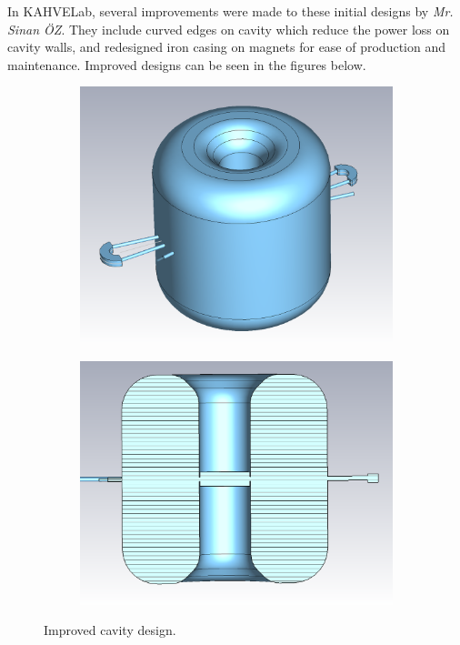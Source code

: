 \documentclass[a4paper,oneside,12pt]{report}
\numberwithin{equation}{chapter}
\begin{document}
In KAHVELab, several improvements were made to these initial designs by \textit{Mr. Sinan ÖZ}. They include curved edges on cavity which reduce the power loss on cavity walls, and redesigned iron casing on magnets for ease of production and maintenance.
Improved designs can be seen in the figures below.
\begin{figure}[H]
    \captionsetup[subfigure]{justification=centering}
    \captionsetup{justification=centering}
    \centering
    \begin{subfigure}{.5\textwidth}
      \centering
      \includegraphics[width=.9\linewidth]{./figures/cst/cst_sinan_cavity_design1.png}
    \end{subfigure}%
    \centering
    \begin{subfigure}{.5\textwidth}
      \centering
      \includegraphics[width=.94\linewidth]{./figures/cst/cst_sinan_cavity_design2.png}
    \end{subfigure}
    \caption{Improved cavity design.}
    \label{fig:improved_cavity_design}
\end{figure}
\end{document}
